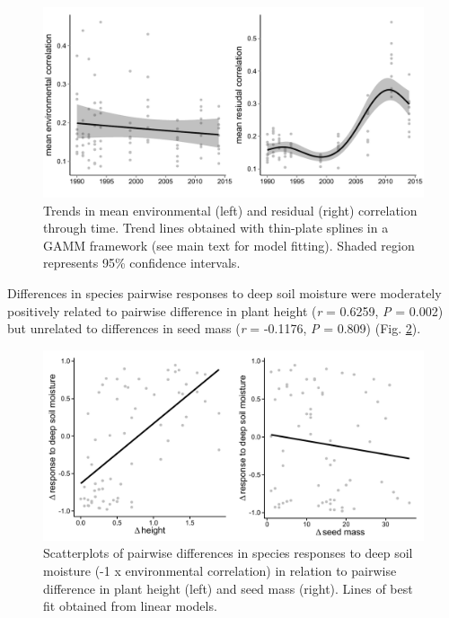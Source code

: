 \begin{figure}[H]
\centering
\includegraphics[width=1.0\linewidth]{Chapter5/Figures/temptrends}
\caption{Trends in mean environmental (left) and residual (right) correlation through time. Trend lines obtained with thin-plate splines in a GAMM framework (see main text for model fitting). Shaded region represents 95\% confidence intervals.}
\label{fig:temptrends}
\end{figure}



Differences in species pairwise responses to deep soil moisture were moderately positively related to pairwise difference in plant height (\textit{r} = 0.6259, \textit{P} = 0.002) but unrelated to differences in seed mass (\textit{r} = -0.1176, \textit{P} = 0.809) (Fig. \ref{fig:traits_diffs}). 

\begin{figure}[H]
\centering
\includegraphics[width=1.0\linewidth]{Chapter5/Figures/traits_diffs}
\caption{Scatterplots of pairwise differences in species responses to deep soil moisture (-1 x environmental correlation) in relation to pairwise difference in plant height (left) and seed mass (right). Lines of best fit obtained from linear models.}
\label{fig:traits_diffs}
\end{figure}

